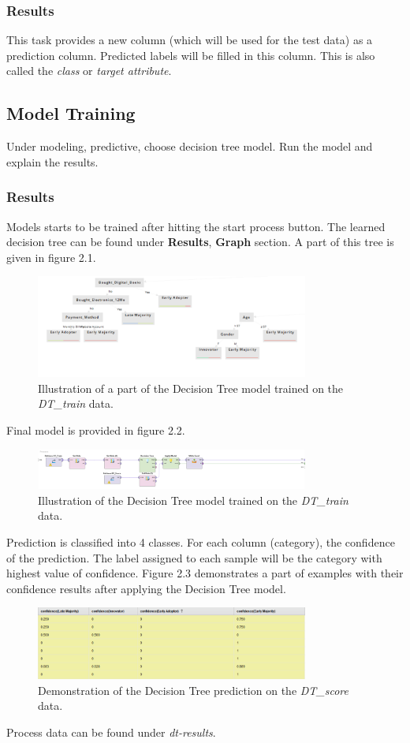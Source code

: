\documentclass[12pt]{article}
\numberwithin{equation}{section}
\numberwithin{table}{section}
\numberwithin{figure}{section}
\begin{document}
\subsubsection*{Results}
This task provides a new column (which will be used for the test data) as a prediction column. Predicted labels will be filled in this column. This is also called the \textit{class} or \textit{target attribute}.

\subsection*{Model Training}
Under modeling, predictive, choose decision tree model. Run the model and explain the results.

\subsubsection*{Results}
Models starts to be trained after hitting the start process button. The learned decision tree can be found under  \textbf{Results}, \textbf{Graph} section. A part of this tree is given in figure 2.1.
\begin{figure}[!h]\centering
	\includegraphics[width=0.8\textwidth]{4_dt_1.png}
	\caption{Illustration of a part of the Decision Tree model trained on the \textit{DT\_train} data.}
	\label{pl1} 
\end{figure}
Final model is provided in figure 2.2.
\begin{figure}[!h]\centering
	\includegraphics[width=0.8\textwidth]{4_dt_2.png}
	\caption{Illustration of the Decision Tree model trained on the \textit{DT\_train} data.}
	\label{pl1} 
\end{figure}
Prediction is classified into 4 classes. For each column (category), the confidence of the prediction. The label assigned to each sample will be the category with highest value of confidence. Figure 2.3 demonstrates a part of examples with their confidence results after applying the Decision Tree model.
\begin{figure}[!h]\centering
	\includegraphics[width=0.8\textwidth]{4_dt_3.png}
	\caption{Demonstration of the Decision Tree prediction on the \textit{DT\_score} data.}
	\label{pl1} 
\end{figure}
Process data can be found under \textit{dt-results}.
\end{document}
